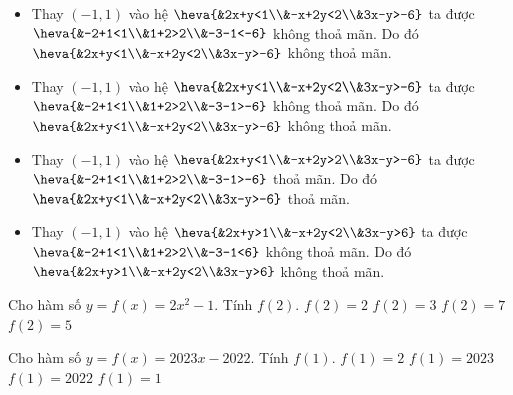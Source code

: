 \begin{ex}
{\begin{itemize}
			\item Thay $(-1,1)$ vào hệ $\heva{&2x+y<1\\&-x+2y<2\\&3x-y>-6}$ ta được $\heva{&-2+1<1\\&1+2>2\\&-3-1<-6}$ không thoả mãn. Do  đó $\heva{&2x+y<1\\&-x+2y<2\\&3x-y>-6}$ không thoả mãn.
			\item Thay $(-1,1)$  vào hệ $\heva{&2x+y<1\\&-x+2y<2\\&3x-y>-6}$ ta được $\heva{&-2+1<1\\&1+2>2\\&-3-1>-6}$ không thoả mãn. Do đó $\heva{&2x+y<1\\&-x+2y<2\\&3x-y>-6}$ không thoả mãn.
			\item Thay $(-1,1)$ vào hệ $\heva{&2x+y<1\\&-x+2y>2\\&3x-y>-6}$ ta được $\heva{&-2+1<1\\&1+2>2\\&-3-1>-6}$ thoả mãn. Do đó  $\heva{&2x+y<1\\&-x+2y<2\\&3x-y>-6}$ thoả mãn.
			\item Thay $(-1,1)$ vào  hệ $\heva{&2x+y>1\\&-x+2y<2\\&3x-y>6}$ ta được $\heva{&-2+1<1\\&1+2>2\\&-3-1<6}$ không thoả mãn. Do đó $\heva{&2x+y>1\\&-x+2y<2\\&3x-y>6}$ không thoả mãn.
	\end{itemize} }
\end{ex}

\begin{ex}%
	Cho hàm số $y=f(x)=2x^2-1$. Tính  $f(2)$.
	 \choice
		{$f(2)=2$} 
		 {$f(2)=3$}
		 {\True $f(2)=7$}
		 {$f(2)=5$}
\end{ex}

\begin{ex}%
	Cho hàm số  $y=f(x)=2023x-2022$. Tính $f(1)$.
	 \choice
		 {$f(1)=2$}
		 {$f(1)=2023$}
		{$f(1)=2022$} 
		 {\True $f(1)=1$}
\end{ex}

